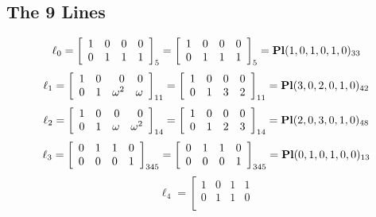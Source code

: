 \documentclass{article}
\begin{document}
{\subsection*{The 9 Lines}
$$
\ell_{0} = 
\left[
\begin{array}{*{4}{r}}
1 & 0 & 0 & 0\\
0 & 1 & 1 & 1\\
\end{array}
\right]
_{5}
=
\left[
\begin{array}{*{4}c}
1  & 0  & 0  & 0\\
0  & 1  & 1  & 1\\
\end{array}
\right]_{5}
={\rm\bf Pl}(1,0,1,0,1,0 )_{33}$$
$$
\ell_{1} = 
\left[
\begin{array}{*{4}{r}}
1 & 0 & 0 & 0\\
0 & 1 & \omega^{2} & \omega \\
\end{array}
\right]
_{11}
=
\left[
\begin{array}{*{4}c}
1  & 0  & 0  & 0\\
0  & 1  & 3  & 2\\
\end{array}
\right]_{11}
={\rm\bf Pl}(3,0,2,0,1,0 )_{42}$$
$$
\ell_{2} = 
\left[
\begin{array}{*{4}{r}}
1 & 0 & 0 & 0\\
0 & 1 & \omega  & \omega^{2}\\
\end{array}
\right]
_{14}
=
\left[
\begin{array}{*{4}c}
1  & 0  & 0  & 0\\
0  & 1  & 2  & 3\\
\end{array}
\right]_{14}
={\rm\bf Pl}(2,0,3,0,1,0 )_{48}$$
$$
\ell_{3} = 
\left[
\begin{array}{*{4}{r}}
0 & 1 & 1 & 0\\
0 & 0 & 0 & 1\\
\end{array}
\right]
_{345}
=
\left[
\begin{array}{*{4}c}
0  & 1  & 1  & 0\\
0  & 0  & 0  & 1\\
\end{array}
\right]_{345}
={\rm\bf Pl}(0,1,0,1,0,0 )_{13}$$
$$
\ell_{4} = 
\left[
\begin{array}{*{4}{r}}
1 & 0 & 1 & 1\\
0 & 1 & 1 & 0\\

\end{array}$$}
\end{document}
